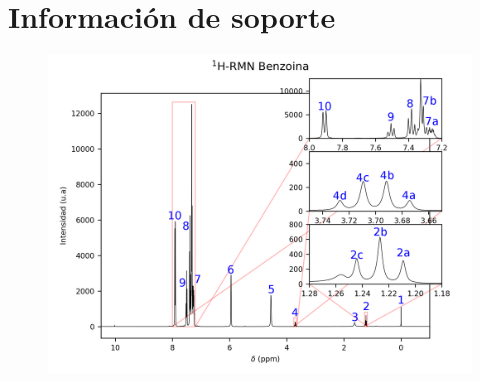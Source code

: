 \documentclass[fleqn,10pt]{SelfArx}
\begin{document}
\section{Informaci\'on de soporte}
\begin{figure}[ht]
	\includegraphics[width=\linewidth]{data/H-Benzoina-edited.png}
\end{figure}
\end{document}
